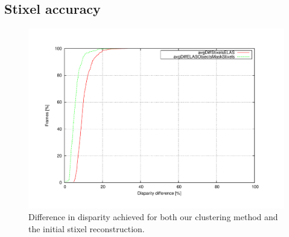 \subsection{Stixel accuracy}\label{ch:chapter04_06_02}

\begin{figure}[h!]
\centering
\includegraphics[trim=50 40 80 60,clip]{disparity}
\caption{Difference in disparity achieved for both our clustering method and the initial stixel reconstruction.}\label{fig:cp04_disparity_comparison}
\end{figure}

